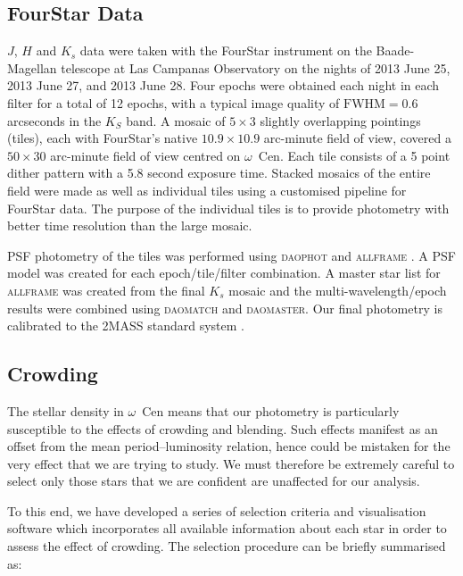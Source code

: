 \documentclass[a4paper,fleqn,usenatbib]{mnras}
\newcommand{\ocen}{$\omega$~Cen\xspace}
\begin{document}
\subsection{FourStar Data}
\label{sec:fourstar_reduction}

$J$, $H$ and $K_s$ data were taken with the FourStar instrument on the Baade-Magellan telescope at Las Campanas Observatory \citep{2013PASP..125..654P} on the nights of 2013 June 25, 2013 June 27, and 2013 June 28. Four epochs were obtained each night in each filter for a total of 12 epochs, with a typical image quality of $\text{FWHM} =0.6$ arcseconds in the $K_{S}$ band. A mosaic of $5\times3$ slightly overlapping pointings (tiles), each with FourStar's native $10.9 \times 10.9$ arc-minute field of view, covered a $50\times30$ arc-minute field of view centred on \ocen. Each tile consists of a 5 point dither pattern with a 5.8 second exposure time. Stacked mosaics of the entire field were made as well as individual tiles using a customised pipeline for FourStar data. The purpose of the individual tiles is to provide photometry with better time resolution than the large mosaic. 

PSF photometry of the tiles was performed using \textsc{daophot} and \textsc{allframe} \citep{1987PASP...99..191S, 1994PASP..106..250S}. A PSF model was created for each epoch/tile/filter combination. A master star list for \textsc{allframe} was created from the final $K_s$ mosaic and the multi-wavelength/epoch results were combined using \textsc{daomatch} and \textsc{daomaster}. Our final photometry is calibrated to the 2MASS standard system \citep{2006AJ....131.1163S}. 

\subsection{Crowding}
\label{sec:crowding}

The stellar density in \ocen means that our photometry is particularly susceptible to the effects of crowding and blending. Such effects manifest as an offset from the mean period--luminosity relation, hence could be mistaken for the very effect that we are trying to study. We must therefore be extremely careful to select only those stars that we are confident are unaffected for our analysis.

To this end, we have developed a series of selection criteria and visualisation software which incorporates all available information about each star in order to assess the effect of crowding. The selection procedure can be briefly summarised as:
\end{document}
